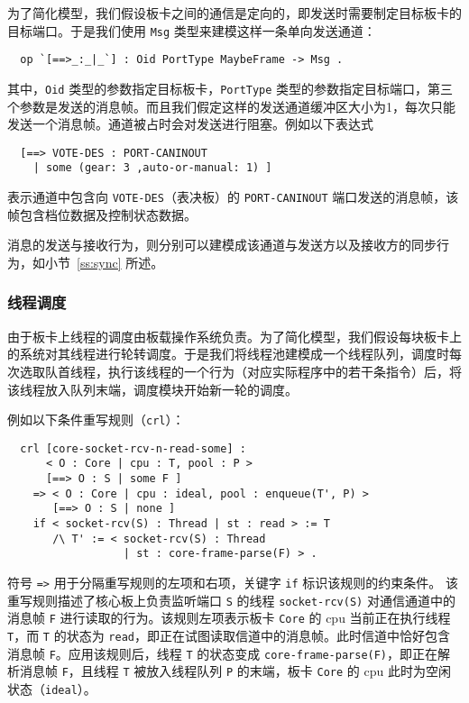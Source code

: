 为了简化模型，我们假设板卡之间的通信是定向的，即发送时需要制定目标板卡的目标端口。于是我们使用 \verb|Msg| 类型来建模这样一条单向发送通道：
\begin{verbatim}
  op `[==>_:_|_`] : Oid PortType MaybeFrame -> Msg .
\end{verbatim}
其中，\verb|Oid| 类型的参数指定目标板卡，\verb|PortType| 类型的参数指定目标端口，第三个参数是发送的消息帧。而且我们假定这样的发送通道缓冲区大小为1，每次只能发送一个消息帧。通道被占时会对发送进行阻塞。例如以下表达式
\begin{verbatim}
  [==> VOTE-DES : PORT-CANINOUT 
    | some (gear: 3 ,auto-or-manual: 1) ]
\end{verbatim}
表示通道中包含向 \verb|VOTE-DES|（表决板）的 \verb|PORT-CANINOUT| 端口发送的消息帧，该帧包含档位数据及控制状态数据。

消息的发送与接收行为，则分别可以建模成该通道与发送方以及接收方的同步行为，如小节~\ref{ss:sync} 所述。 

\subsubsection{线程调度}

由于板卡上线程的调度由板载操作系统负责。为了简化模型，我们假设每块板卡上的系统对其线程进行轮转调度。于是我们将线程池建模成一个线程队列，调度时每次选取队首线程，执行该线程的一个行为（对应实际程序中的若干条指令）后，将该线程放入队列末端，调度模块开始新一轮的调度。

例如以下条件重写规则（\verb|crl|）：
\begin{verbatim}
  crl [core-socket-rcv-n-read-some] :
      < O : Core | cpu : T, pool : P > 
      [==> O : S | some F ]
    => < O : Core | cpu : ideal, pool : enqueue(T', P) >
       [==> O : S | none ]
    if < socket-rcv(S) : Thread | st : read > := T
       /\ T' := < socket-rcv(S) : Thread 
                  | st : core-frame-parse(F) > . 
\end{verbatim}
符号 \verb|=>| 用于分隔重写规则的左项和右项，关键字 \verb|if| 标识该规则的约束条件。
该重写规则描述了核心板上负责监听端口 \verb|S| 的线程 \verb|socket-rcv(S)| 对通信通道中的消息帧 \verb|F| 进行读取的行为。该规则左项表示板卡 \verb|Core| 的 cpu 当前正在执行线程 \verb|T|，而 \verb|T| 的状态为 \verb|read|，即正在试图读取信道中的消息帧。此时信道中恰好包含消息帧 \verb|F|。应用该规则后，线程 \verb|T| 的状态变成 \verb|core-frame-parse(F)|，即正在解析消息帧 \verb|F|，且线程 \verb|T| 被放入线程队列 \verb|P| 的末端，板卡 \verb|Core| 的 cpu 此时为空闲状态（\verb|ideal|）。


